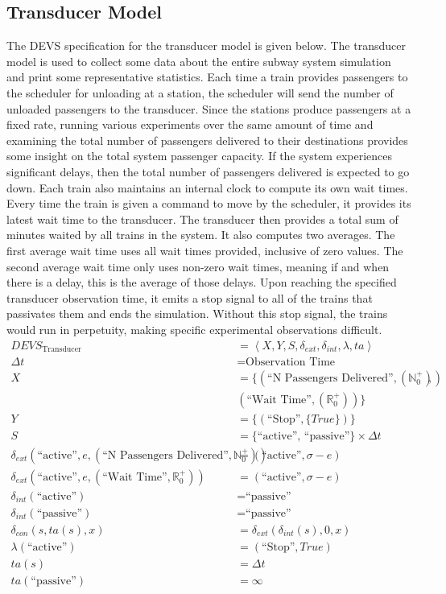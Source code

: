 \subsection{Transducer Model}
The DEVS specification for the transducer model is given below.  The transducer model is used to collect some data about the entire subway system simulation and print some representative statistics. Each time a train provides passengers to the scheduler for unloading at a station, the scheduler will send the number of unloaded passengers to the transducer.  Since the stations produce passengers at a fixed rate, running various experiments over the same amount of time and examining the total number of passengers delivered to their destinations provides some insight on the total system passenger capacity.  If the system experiences significant delays, then the total number of passengers delivered is expected to go down.  Each train also maintains an internal clock to compute its own wait times. Every time the train is given a command to move by the scheduler, it provides its latest wait time to the transducer.  The transducer then provides a total sum of minutes waited by all trains in the system.  It also computes two averages.  The first average wait time uses all wait times provided, inclusive of zero values.  The second average wait time only uses non-zero wait times, meaning if and when there is a delay, this is the average of those delays.  Upon reaching the specified transducer observation time, it emits a stop signal to all of the trains that passivates them and ends the simulation.  Without this stop signal, the trains would run in perpetuity, making specific experimental observations difficult.
\begin{align*} DEVS_{\textrm{Transducer}} &= \left<X,Y,S,\delta_{ext},\delta_{int},\lambda,ta\right> \\
\Delta t &= \text{Observation Time} \\
X &= \lbrace (\text{``N Passengers Delivered''},(\mathbb{N}_0^+)), \\
 & (\text{``Wait Time''},(\mathbb{R}_0^+))\rbrace \\
Y &= \lbrace(\text{``Stop''},\lbrace True\rbrace)\rbrace \\
S &= \lbrace\text{``active'', ``passive''}\rbrace\times\Delta t \\
\delta_{ext}(\text{``active''},e,(\text{``N Passengers Delivered''},\mathbb{N}_0^+)) &= (\text{``active''},\sigma-e) \\
\delta_{ext}(\text{``active''},e,(\text{``Wait Time''},\mathbb{R}_0^+)) &= (\text{``active''},\sigma-e) \\
\delta_{int}(\text{``active''}) &= \text{``passive''} \\
\delta_{int}(\text{``passive''}) &= \text{``passive''} \\
\delta_{con}(s,ta(s),x) &= \delta_{ext}(\delta_{int}(s),0,x) \\
\lambda(\text{``active''}) &= (\text{``Stop''},True) \\
ta(s) &= \Delta t \\
ta(\text{``passive''}) &= \infty \\
\end{align*}

